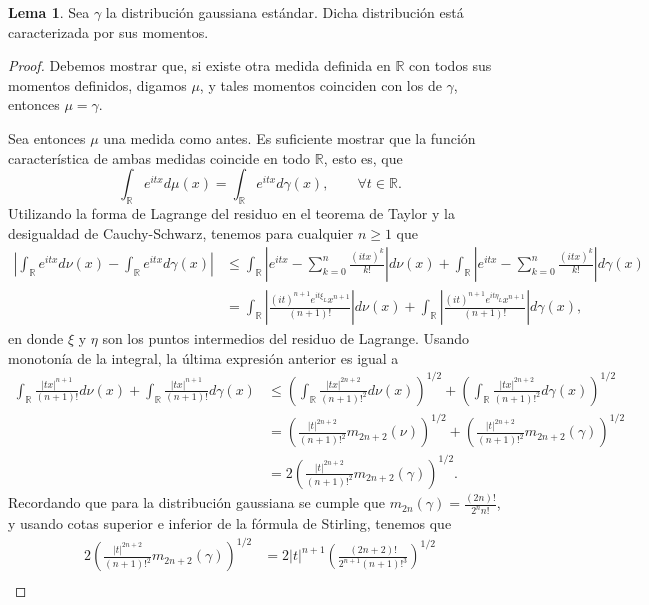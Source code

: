 \documentclass[letterpaper,twoside,12pt]{book}
\newcommand{\R}{\mathbb{R}}
\newcommand{\1}{\mathds{1}}
\newcommand{\abs}[1]{\left\lvert #1 \right\rvert}
\theoremstyle{definition}
\theoremstyle{definition}
\theoremstyle{remark}
\theoremstyle{definition}
\theoremstyle{definition}
\theoremstyle{definition}
\theoremstyle{definition}
\theoremstyle{definition}
\newtheorem{lema}{Lema}
\begin{document}
\begin{lema} 
 Sea $\gamma$ la distribución gaussiana estándar. Dicha distribución está caracterizada por sus momentos.
 \end{lema}
 \begin{proof} 
    Debemos mostrar que, si existe otra medida definida en $\R$ con todos sus momentos definidos, digamos $\mu$, y  tales momentos coinciden con los de $\gamma$, entonces $\mu=\gamma$.

    Sea entonces $\mu$ una medida como antes. Es suficiente mostrar que la función característica de ambas medidas coincide en todo $\R$, esto es, que 
    \[
      \int_\R e^{itx}d\mu(x)=\int_\R e^{itx}d\gamma(x), \qquad \forall t\in \R.
    \]
    Utilizando la forma de Lagrange del residuo en el teorema de Taylor y la desigualdad de Cauchy-Schwarz, tenemos para cualquier $n\geq1$ que
    \begin{align*}
      \abs{\int_{\R}e^{itx}d\nu(x)-\int_\R e^{itx}d\gamma(x)}&\leq \int_\R \abs{e^{itx}-\sum_{k=0}^{n}\frac{(itx)^k}{k!}}d\nu(x)+\int_\R \abs{e^{itx}-\sum_{k=0}^{n}\frac{(itx)^k}{k!}}d\gamma(x)\\
      &=\int_\R \abs{\frac{(it)^{n+1}e^{it\xi_L}x^{n+1}}{(n+1)!}}d\nu(x)+\int_\R \abs{\frac{(it)^{n+1}e^{it\eta_L}x^{n+1}}{(n+1)!}}d\gamma(x),
   \end{align*}
   en donde $\xi$ y $\eta$ son los puntos intermedios del residuo de Lagrange.
   Usando monotonía de la integral, la última expresión anterior es igual a 
      \begin{align*}
      \int_\R \frac{\abs{tx}^{n+1}}{(n+1)!}d\nu(x)+\int_\R \frac{\abs{tx}^{n+1}}{(n+1)!}d\gamma(x)&\leq \left(\int_{\R}\frac{\abs{tx}^{2n+2}}{(n+1)!^2}d\nu(x)\right)^{1/2}+\left(\int_{\R}\frac{\abs{tx}^{2n+2}}{(n+1)!^2}d\gamma(x)\right)^{1/2}\\
      &=\left(\frac{\abs{t}^{2n+2}}{(n+1)!^2}m_{2n+2}(\nu)\right)^{1/2}+\left(\frac{\abs{t}^{2n+2}}{(n+1)!^2}m_{2n+2}(\gamma)\right)^{1/2}\\
      &=2\left(\frac{\abs{t}^{2n+2}}{(n+1)!^2}m_{2n+2}(\gamma)\right)^{1/2}.
    \end{align*}
   Recordando que para la distribución gaussiana se cumple que $m_{2n}(\gamma)=\frac{(2n)!}{2^{n}n!}$, y usando cotas superior e inferior de la fórmula de Stirling, tenemos que 
   \begin{align*}
      2\left(\frac{\abs{t}^{2n+2}}{(n+1)!^2}m_{2n+2}(\gamma)\right)^{1/2}&=2|t|^{n+1}\left(\frac{(2n+2)!}{2^{n+1}(n+1)!^3}\right)^{1/2}\\

\end{align*}
\end{proof}
\end{document}
